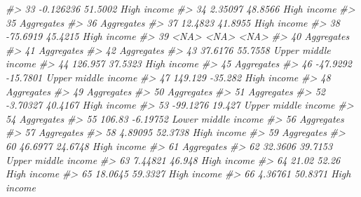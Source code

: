 \documentclass[
  xelatex, ja=standard]{bxjsbook}
\newenvironment{Shaded}{\begin{snugshade}}{\end{snugshade}}
\newcommand{\CommentTok}[1]{\textcolor[rgb]{0.56,0.35,0.01}{\textit{#1}}}
\theoremstyle{definition}
\theoremstyle{definition}
\theoremstyle{definition}
\theoremstyle{definition}
\theoremstyle{remark}
\begin{document}
\begin{Shaded}
\begin{Highlighting}[]
\CommentTok{\#\textgreater{} 33   {-}0.126236    51.5002         High income}
\CommentTok{\#\textgreater{} 34     2.35097    48.8566         High income}
\CommentTok{\#\textgreater{} 35                                 Aggregates}
\CommentTok{\#\textgreater{} 36                                 Aggregates}
\CommentTok{\#\textgreater{} 37     12.4823    41.8955         High income}
\CommentTok{\#\textgreater{} 38    {-}75.6919    45.4215         High income}
\CommentTok{\#\textgreater{} 39        \textless{}NA\textgreater{}       \textless{}NA\textgreater{}                \textless{}NA\textgreater{}}
\CommentTok{\#\textgreater{} 40                                 Aggregates}
\CommentTok{\#\textgreater{} 41                                 Aggregates}
\CommentTok{\#\textgreater{} 42                                 Aggregates}
\CommentTok{\#\textgreater{} 43     37.6176    55.7558 Upper middle income}
\CommentTok{\#\textgreater{} 44     126.957    37.5323         High income}
\CommentTok{\#\textgreater{} 45                                 Aggregates}
\CommentTok{\#\textgreater{} 46    {-}47.9292   {-}15.7801 Upper middle income}
\CommentTok{\#\textgreater{} 47     149.129    {-}35.282         High income}
\CommentTok{\#\textgreater{} 48                                 Aggregates}
\CommentTok{\#\textgreater{} 49                                 Aggregates}
\CommentTok{\#\textgreater{} 50                                 Aggregates}
\CommentTok{\#\textgreater{} 51                                 Aggregates}
\CommentTok{\#\textgreater{} 52    {-}3.70327    40.4167         High income}
\CommentTok{\#\textgreater{} 53    {-}99.1276     19.427 Upper middle income}
\CommentTok{\#\textgreater{} 54                                 Aggregates}
\CommentTok{\#\textgreater{} 55      106.83   {-}6.19752 Lower middle income}
\CommentTok{\#\textgreater{} 56                                 Aggregates}
\CommentTok{\#\textgreater{} 57                                 Aggregates}
\CommentTok{\#\textgreater{} 58     4.89095    52.3738         High income}
\CommentTok{\#\textgreater{} 59                                 Aggregates}
\CommentTok{\#\textgreater{} 60     46.6977    24.6748         High income}
\CommentTok{\#\textgreater{} 61                                 Aggregates}
\CommentTok{\#\textgreater{} 62     32.3606    39.7153 Upper middle income}
\CommentTok{\#\textgreater{} 63     7.44821     46.948         High income}
\CommentTok{\#\textgreater{} 64       21.02      52.26         High income}
\CommentTok{\#\textgreater{} 65     18.0645    59.3327         High income}
\CommentTok{\#\textgreater{} 66     4.36761    50.8371         High income}

\end{Highlighting}
\end{Shaded}
\end{document}
